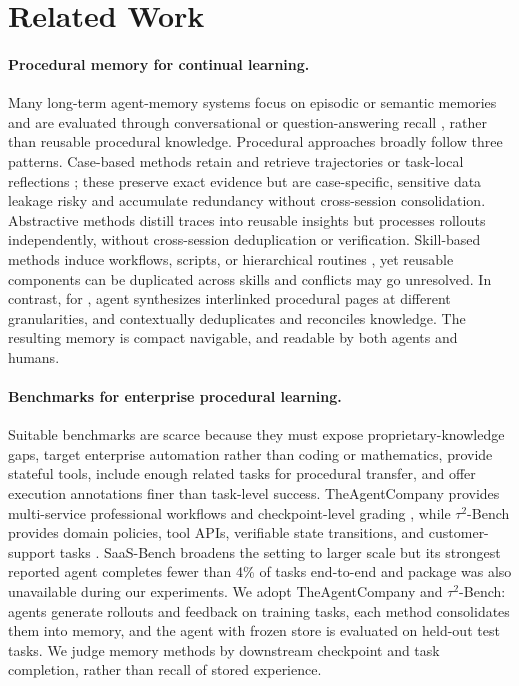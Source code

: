 \section{Related Work}
\label{sec:related}


\paragraph{Procedural memory for continual learning.}
Many long-term agent-memory systems focus on episodic or semantic memories and are evaluated through conversational or question-answering recall
\citep{memgpt,mem0,amem,coala,memsurvey}, rather than reusable procedural
knowledge. Procedural approaches broadly follow three patterns. Case-based
methods retain and retrieve trajectories or task-local reflections
\citep{reflexion,memento}; these preserve exact evidence but are
case-specific, sensitive data leakage risky and accumulate redundancy without cross-session consolidation. Abstractive methods distill traces into reusable
insights \citep{expel,autoguide,insights} but processes rollouts independently, without cross-session deduplication or verification. Skill-based methods induce workflows, scripts, or hierarchical routines \citep{voyager,awm,memp,skillx}, yet reusable components can be duplicated across skills and conflicts may go unresolved. In contrast, for \method, agent synthesizes interlinked procedural pages at different granularities, and contextually deduplicates and reconciles knowledge. The resulting memory is compact navigable, and readable by both agents and humans.

\paragraph{Benchmarks for enterprise procedural learning.}
Suitable benchmarks are scarce because they must expose proprietary-knowledge
gaps, target enterprise automation rather than coding or mathematics, provide
stateful tools, include enough related tasks for procedural transfer, and offer execution annotations finer than task-level success.
TheAgentCompany provides multi-service professional workflows and
checkpoint-level grading \citep{theagentcompany}, while $\tau^2$-Bench  provides domain policies, tool APIs, verifiable state transitions, and customer-support tasks \citep{tau2bench}.
SaaS-Bench broadens the setting to larger scale but its strongest reported agent completes fewer
than 4\% of tasks end-to-end \citep{saasbench} and package was also unavailable during our experiments. We adopt TheAgentCompany and $\tau^2$-Bench: agents generate rollouts and feedback on training tasks, each method consolidates them into memory, and the agent with frozen store is evaluated on held-out test tasks. We judge memory methods by downstream
checkpoint and task completion, rather than recall of stored experience.


